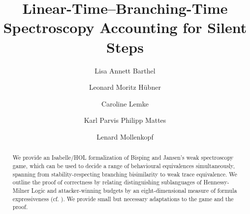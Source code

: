 \documentclass[11pt,a4paper]{article}
\begin{document}
\title{Linear-Time--Branching-Time Spectroscopy Accounting for Silent Steps}
\author{Lisa Annett Barthel \and Leonard Moritz Hübner \and Caroline Lemke \and Karl Parvis Philipp Mattes \and Lenard Mollenkopf}
\maketitle

\begin{abstract}
\noindent We provide an Isabelle/HOL formalization of Bisping and Jansen's \cite{bisping2023lineartimebranchingtime} weak spectroscopy game, which can be used to decide
a range of behavioural equivalences simultaneously, spanning from stability-respecting branching bisimilarity to weak trace equivalence.
We outline the proof of correctness by relating distinguishing sublanguages of Hennessy-Milner Logic and attacker-winning budgets by an eight-dimensional 
measure of formula expressiveness (cf. \cite[Abstract]{bisping2023lineartimebranchingtime}). We provide small but necessary adaptations to the game and the proof.
\end{abstract}

\tableofcontents


















\newpage
\appendix





\end{document}

